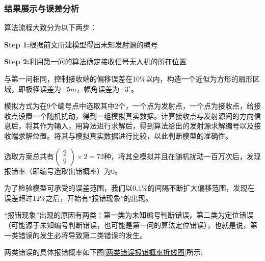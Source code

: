 \documentclass{ctexart}
\begin{document}
\subsubsection{结果展示与误差分析}

算法流程大致分为以下两步：

\textbf{Step 1:}根据前文所建模型得出未知发射源的编号

\textbf{Step 2:}利用第一问的算法确定接收信号无人机的所在位置

与第一问相同，控制接收端的偏移误差在10\%以内，构造一个近似为方形的扇形区域，即极径误差为$\pm 5m $，幅角误差为$\pm 3^{\circ}$。

模拟方式为在9个编号点中选取其中2个，一个点为发射点，一个点为接收点，给接收点设置一个随机扰动，得到一组模拟真实数据。计算接收点与发射源间的方向信息后，将其作为输入，用算法进行求解后，得到算法给出的发射源求解编号以及接收端求解位置。将其与模拟真实数据进行比较，以此判断模型的准确性。

选取方案总共有$\begin{pmatrix} 2 \\ 9 \end{pmatrix}\times 2=72$种，将其全模拟并且在随机扰动一百万次后，发现报错率（即编号选取出错概率）为0。

为了检验模型可承受的误差范围，我们以0.1\%的间隔不断扩大偏移范围，发现在误差超过12\%之后，开始有“报错现象”的出现。

“报错现象”出现的原因有两类：第一类为未知编号判断错误，第二类为定位错误（可能源于未知编号判断错误，也可能是第一问的算法定位错误），也就是说，第一类错误的发生必将导致第二类错误的发生。

两类错误的具体报错概率如下图\ref{两类错误报错概率折线图}所示:
\end{document}
